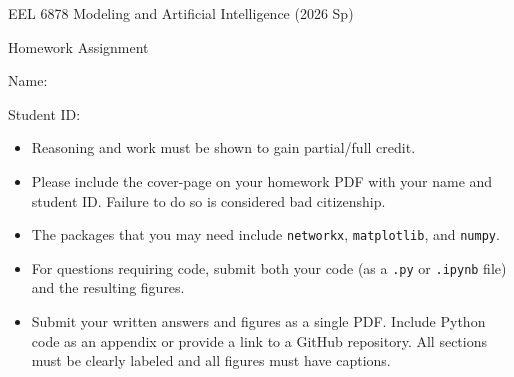 \documentclass[11pt]{exam}
\begin{document}
\centerline{\Large \sc EEL 6878 Modeling and Artificial Intelligence (2026 Sp)}
\centerline{\Large \sc Homework Assignment}
\pagestyle{empty}

\hrulefill

\vspace{2cm}

{\Large \sc Name:}

\vspace{2cm}

{\Large \sc Student ID:}

\vspace{6cm}

\begin{itemize}
  \item Reasoning and work must be shown to gain partial/full credit.
  \item Please include the cover-page on your homework PDF with your name and student ID.
        Failure to do so is considered bad citizenship.
  \item The packages that you may need include \texttt{networkx}, \texttt{matplotlib},
        and \texttt{numpy}.
  \item For questions requiring code, submit both your code (as a \texttt{.py} or
        \texttt{.ipynb} file) and the resulting figures.
  \item Submit your written answers and figures as a single PDF. Include Python code
        as an appendix or provide a link to a GitHub repository. All sections must be
        clearly labeled and all figures must have captions.
\end{itemize}

\clearpage
\end{document}
